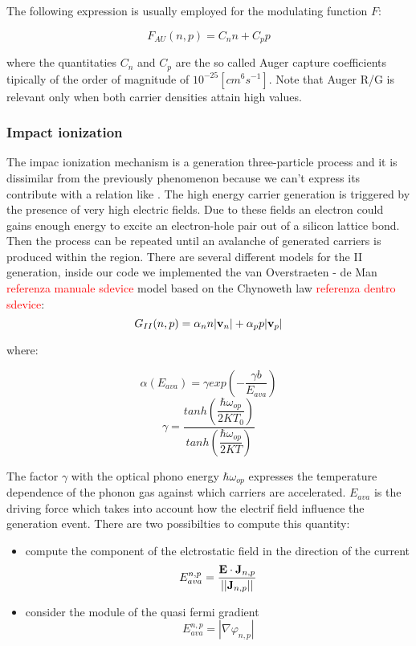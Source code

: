 The following expression is usually employed for the modulating function $F$:

\begin{equation}
F_{AU}(n,p) = C_nn+C_pp
\end{equation}

where the quantitaties $C_n$ and $C_p$ are the so called  Auger capture coefficients tipically of the order of magnitude of $10^{-25}[cm^6s^{-1}]$.
Note that Auger R/G is relevant only when both carrier densities attain high values.


\subsubsection{Impact ionization}

The impac ionization mechanism is a generation three-particle process and it is dissimilar from the previously phenomenon because we can't express its contribute with a relation like . The high energy carrier generation is triggered by the presence of very high electric fields. Due to these fields an electron could gains enough energy to excite an electron-hole pair out of a silicon lattice bond. Then the process can be repeated until an avalanche of generated carriers is produced within the region.
There are several different models for the II generation, inside our code we implemented the van Overstraeten - de Man \textcolor{red}{referenza manuale sdevice} model based on the Chynoweth law \textcolor{red}{referenza dentro sdevice}:
\begin{equation}
G_{II}(n,p)= \alpha_n n |\mathbf{v}_n| + \alpha_p p |\mathbf{v}_p|
\end{equation}

where:

\begin{equation}
\alpha(E_{ava}) = \gamma exp\left(-\dfrac{\gamma b}{E_{ava}} \right)
\end{equation} 
\begin{equation}
\gamma = \dfrac{tanh\left(\dfrac{\hbar \omega_{op}}{2KT_0} \right) }{tanh\left(\dfrac{\hbar \omega_{op}}{2KT} \right)}
\end{equation}

The factor $\gamma$ with the optical phono energy $\hbar \omega_{op}$ expresses the temperature dependence of the phonon gas against which carriers are accelerated.
$E_{ava}$ is the driving force which takes into account how the electrif field influence the generation event. There are two possibilties to compute this quantity:
\begin{itemize}
\item compute the component of the elctrostatic field in the direction of the current
\begin{equation}
E_{ava}^{n,p} = \dfrac{\mathbf{E}\cdot\mathbf{J}_{n,p}}{||\mathbf{J}_{n,p}||}
\end{equation}
\item consider the module of the quasi fermi gradient
\begin{equation}
E_{ava}^{n,p} = |\nabla \varphi_{n,p}|
\end{equation}
\end{itemize}
